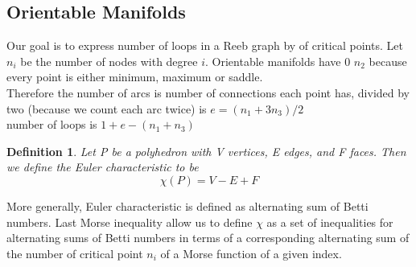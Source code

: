 \documentclass[]{article}
\newtheorem{definition}{Definition}
\begin{document}
\subsection{Orientable Manifolds} 
Our goal is to express number of loops in a Reeb graph by  of critical points. Let $n_i$ be the number of nodes with degree $i$. Orientable manifolds have 0 $n_2$ because every point is either minimum, maximum or saddle.\\
Therefore the number of arcs is number of connections each point has, divided by two (because we count each arc twice) is $e = (n_1+3n_3)/2$ \\ 
number of loops is $1+e-(n_1+n_3)$
\begin{definition}
    Let P be a polyhedron with V vertices, E edges, and F faces. Then we define the Euler characteristic to be 
    \begin{equation}
        \chi(P) = V - E + F  
    \end{equation}
\end{definition} 
More generally, Euler characteristic is defined as alternating sum of Betti numbers. Last Morse inequality allow us to define $\chi$ as a set of inequalities for alternating sums of Betti numbers in terms of a corresponding alternating sum of the number of critical point $n_i$ of a Morse function of a given index.
\end{document}
